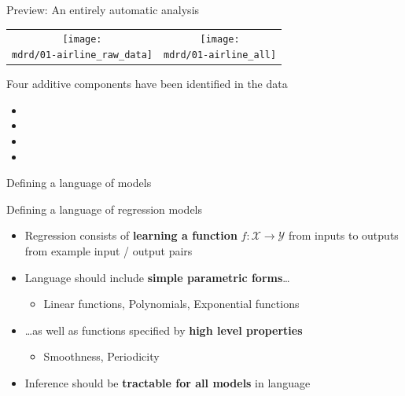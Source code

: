 \begin{frame}{Preview: An entirely automatic analysis}

\newcommand{\wmgd}{0.5\columnwidth}
\newcommand{\hmgd}{3.0cm}
\newcommand{\mdrd}{figures/01-airline}
\newcommand{\mbm}{\hspace{-0.3cm}}
\begin{tabular}{cc}
\mbm \texttt{[image: \\mdrd/01-airline\_raw\_data]} & \texttt{[image: \\mdrd/01-airline\_all]}
\end{tabular}
\vspace{0.5\baselineskip}

{\footnotesize
Four additive components have been identified in the data
\begin{itemize}

  \item  

  \item  

  \item  

  \item  

\end{itemize}
}
\end{frame}

\begin{frame}{Defining a language of models}
  
\end{frame}

\begin{frame}{Defining a language of regression models}
  \begin{itemize}
    \item Regression consists of {\bf learning a function} $f: \mathcal{X} \to \mathcal{Y}$ from inputs to outputs from example input / output pairs
    \vspace{\baselineskip}
    \item Language should include {\bf simple parametric forms}\ldots
    \begin{itemize}
       \item \eg Linear functions, Polynomials, Exponential functions
     \end{itemize}
    \vspace{\baselineskip}
    \item \ldots as well as functions specified by {\bf high level properties}
    \begin{itemize}
       \item \eg Smoothness, Periodicity
     \end{itemize}
    \vspace{\baselineskip}
    \item Inference should be {\bf tractable for all models} in language
  \end{itemize}
\end{frame}

